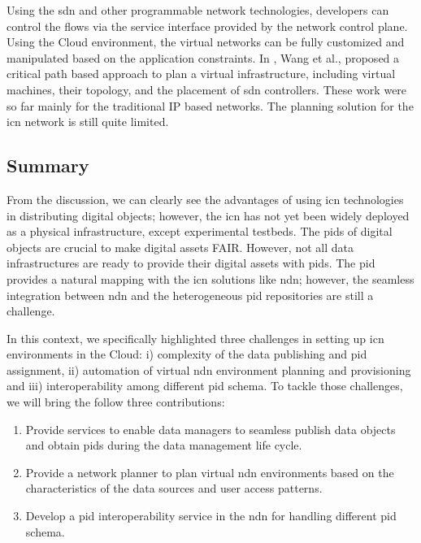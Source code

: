 \documentclass[conference]{IEEEtran}
\begin{document}
Using the \gls{sdn} and other programmable network technologies, developers can control the flows via the service interface provided by the network control plane\cite{koulouzis_sdn-aware_2016}. Using the Cloud environment, the virtual networks can be fully customized and manipulated based on the application constraints. In \cite{wang_planning_2017}\cite{wang_qos-aware_2017}, Wang et al., proposed a critical path based approach to plan a virtual infrastructure, including virtual machines, their topology, and the placement of \gls{sdn} controllers. These work were so far mainly for the traditional IP based networks. The planning solution for the \gls{icn} network is still quite limited. 



\subsection{Summary}
From the discussion, we can clearly see the advantages of using \gls{icn} technologies in distributing digital objects; however, the \gls{icn} has not yet been widely deployed as a physical infrastructure, except experimental testbeds. The \glspl{pid} of digital objects are crucial to make digital assets FAIR. However, not all data infrastructures are ready to provide their digital assets with \glspl{pid}. The \gls{pid} provides a natural mapping with the \gls{icn} solutions like \gls{ndn}; however, the seamless integration between \gls{ndn} and the heterogeneous \gls{pid} repositories are still a challenge.

In this context, we specifically highlighted three challenges in setting up \gls{icn} environments in the Cloud: i) complexity of the data publishing and \gls{pid} assignment, ii) automation of virtual \gls{ndn} environment planning and provisioning and iii) interoperability among different \gls{pid} schema. 
To tackle those challenges, we will bring the follow three contributions:
\begin{enumerate}
    \item Provide services to enable data managers to seamless publish data objects and obtain \glspl{pid} during the data management life cycle.
    \item Provide a network planner to plan virtual \gls{ndn} environments based on the characteristics of the data sources and user access patterns.
    \item Develop a \gls{pid} interoperability service in the \gls{ndn} for handling different \gls{pid} schema. 
\end{enumerate}
\end{document}

